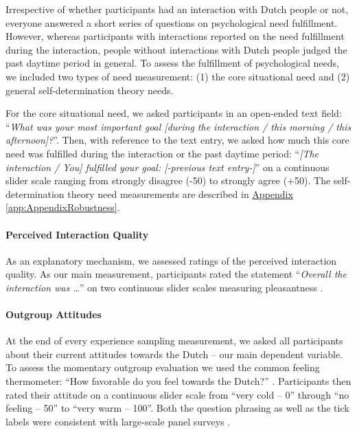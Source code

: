 \documentclass[man, 12pt, a4paper, mask]{apa7}
\theoremstyle{break}
\theoremstyle{plain}
\newcommand{\appref}[2][]{\hyperref[#2]{Appendix \ref*{#2}#1}}
\begin{document}
Irrespective of whether participants had an interaction with Dutch
people or not, everyone answered a short series of questions on
psychological need fulfillment. However, whereas participants with
interactions reported on the need fulfillment during the interaction,
people without interactions with Dutch people judged the past daytime
period in general. To assess the fulfillment of psychological needs, we
included two types of need measurement: (1) the core situational need
and (2) general self-determination theory needs.

For the core situational need, we asked participants in an open-ended
text field:
``\textit{What was your most important goal [during the interaction / this morning / this afternoon]?}''.
Then, with reference to the text entry, we asked how much this core need
was fulfilled during the interaction or the past daytime period:
``\textit{[The interaction / You] fulfilled your goal: [-previous text entry-]}''
on a continuous slider scale ranging from strongly disagree (-50) to
strongly agree (+50). The self-determination theory need measurements
are described in \appref{app:AppendixRobustness}.

\paragraph{Perceived Interaction Quality}

As an explanatory mechanism, we assessed ratings of the perceived
interaction quality. As our main measurement, participants rated the
statement ``\textit{Overall the interaction was …}'' on two continuous
slider scales measuring pleasantness
\citep[from unpleasant (-50) to pleasant (+50)) and meaningfulness (from superficial (-50) to meaningful (+50); both items adapted from][]{Downie2008}.

\paragraph{Outgroup Attitudes}

At the end of every experience sampling measurement, we asked all
participants about their current attitudes towards the Dutch -- our main
dependent variable. To assess the momentary outgroup evaluation we used
the common feeling thermometer: ``How favorable do you feel towards the
Dutch?'' \citep[][]{Lavrakas2008}. Participants then rated their
attitude on a continuous slider scale from ``very cold -- 0'' through
``no feeling -- 50'' to ``very warm -- 100''. Both the question phrasing
as well as the tick labels were consistent with large-scale panel
surveys \citep[e.g.,][]{DeBell2010}.
\end{document}

